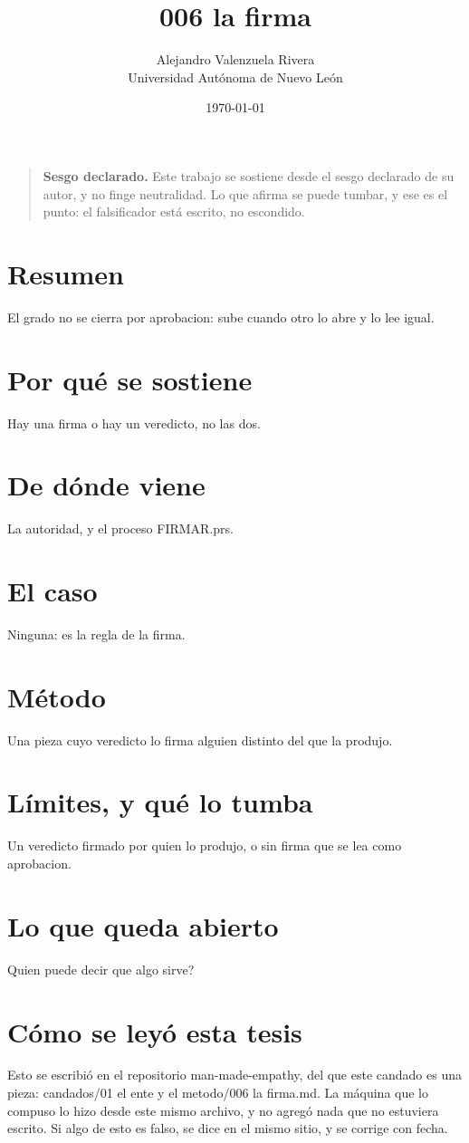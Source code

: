 \documentclass[11pt,a4paper]{article}
\title{006 la firma}
\author{Alejandro Valenzuela Rivera\\\small Universidad Autónoma de Nuevo León}
\date{\today}
\begin{document}
\maketitle

\begin{quote}
\textbf{Sesgo declarado.} Este trabajo se sostiene desde el sesgo declarado de su autor, y no finge neutralidad. Lo que afirma se puede tumbar, y ese es el punto: el falsificador está escrito, no escondido.
\end{quote}

\section*{Resumen}
El grado no se cierra por aprobacion: sube cuando otro lo abre y lo lee igual.

\section{Por qué se sostiene}
Hay una firma o hay un veredicto, no las dos.

\section{De dónde viene}
La autoridad, y el proceso FIRMAR.prs.

\section{El caso}
Ninguna: es la regla de la firma.

\section{Método}
Una pieza cuyo veredicto lo firma alguien distinto del que la produjo.

\section{Límites, y qué lo tumba}
Un veredicto firmado por quien lo produjo, o sin firma que se lea como aprobacion.

\section{Lo que queda abierto}
\textquestiondown{}Quien puede decir que algo sirve?

\section*{Cómo se leyó esta tesis}
Esto se escribió en el repositorio man-made-empathy, del que este candado es una pieza: candados/01 el ente y el metodo/006 la firma.md. La máquina que lo compuso lo hizo desde este mismo archivo, y no agregó nada que no estuviera escrito. Si algo de esto es falso, se dice en el mismo sitio, y se corrige con fecha.
\end{document}
